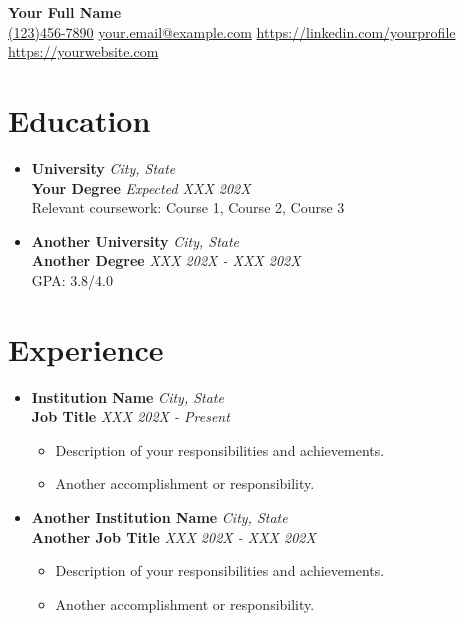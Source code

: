 \documentclass[10pt]{article}
\newcommand{\sectionline}{\noindent\makebox[\linewidth]{\rule{\textwidth}{0.5pt}}}
\newcommand{\resumesection}[1]{\vspace{-0.5em}\section*{\textbf{#1}}\vspace{-1.5em}\sectionline\vspace{0.0em}}
\newenvironment{resumeitemize}
{\begin{itemize}[leftmargin=*, noitemsep, topsep=0pt, label={}]} %
{\end{itemize}}
\newenvironment{subitemize}
{\begin{itemize}[leftmargin=*, noitemsep, topsep=0pt, label=\textbullet]} %
{\end{itemize}}
\begin{document}
\begin{center}
    {\Huge \textbf{Your Full Name}} \\[0.5em]
    \href{tel:1234567890}{(123)456-7890} \textbar{} 
    \href{mailto:your.email@example.com}{your.email@example.com} \textbar{}
    \href{https://linkedin.com/yourprofile}{https://linkedin.com/yourprofile} \textbar{} \href{https://yourwebsite.com}{https://yourwebsite.com}
\end{center}

\vspace{-0.25in}

\resumesection{Education}
\begin{resumeitemize}
    \item \textbf{University} \hfill \textit{City, State} \\
    \textbf{Your Degree} \hfill \textit{Expected XXX 202X} \\
    Relevant coursework: Course 1, Course 2, Course 3

    \vspace{0.1in}
    
    \item \textbf{Another University} \hfill \textit{City, State} \\
    \textbf{Another Degree} \hfill \textit{XXX 202X - XXX 202X} \\
    GPA: 3.8/4.0
\end{resumeitemize}

\resumesection{Experience}
\begin{resumeitemize}
    \item \textbf{Institution Name} \hfill \textit{City, State} \\
    \textbf{Job Title} \hfill \textit{XXX 202X - Present}
    \begin{subitemize}
        \item Description of your responsibilities and achievements.
        \item Another accomplishment or responsibility.
    \end{subitemize}
    
    \vspace{0.1in}
    
    \item \textbf{Another Institution Name} \hfill \textit{City, State} \\
    \textbf{Another Job Title} \hfill \textit{XXX 202X - XXX 202X} 
    \begin{subitemize}
        \item Description of your responsibilities and achievements.
        \item Another accomplishment or responsibility.
    \end{subitemize}
\end{resumeitemize}
\end{document}
